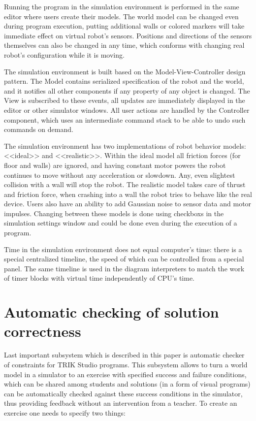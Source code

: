 \documentclass[conference]{IEEEtran}
\begin{document}
Running the program in the simulation environment is performed in the same editor where users create their models. The world model can be changed even during program execution, putting additional walls or colored markers will take immediate effect on virtual robot's sensors. Positions and directions of the sensors themselves can also be changed in any time, which conforms with changing real robot's configuration while it is moving.

The simulation environment is built based on the Model-View-Controller design pattern. The Model contains serialized specification of the robot and the world, and it notifies all other components if any property of any object is changed. The View is subscribed to these events, all updates are immediately displayed in the editor or other simulator windows. All user actions are handled by the Controller component, which uses an intermediate command stack to be able to undo such commands on demand.

The simulation environment has two implementations of robot behavior models: <<ideal>> and <<realistic>>. Within the ideal model all friction forces (for floor and walls) are ignored, and having constant motor powers the robot continues to move without any acceleration or slowdown. Any, even slightest collision with a wall will stop the robot. The realistic model takes care of thrust and friction force, when crashing into a wall the robot tries to behave like the real device. Users also have an ability to add Gaussian noise to sensor data and motor impulses. Changing between these models is done using checkboxs in the simulation settings window and could be done even during the execution of a program. 

Time in the simulation environment does not equal computer's time: there is a special centralized timeline, the speed of which can be controlled from a special panel. The same timeline is used in the diagram interpreters to match the work of timer blocks with virtual time independently of CPU's time.

\section{Automatic checking of solution correctness}
\label{chapter:constraintsChecker}

Last important subsystem which is described in this paper is automatic checker of constraints for TRIK Studio programs. This subsystem allows to turn a world model in a simulator to an exercise with specified success and failure conditions, which can be shared among students and solutions (in a form of visual programs) can be automatically checked against these success conditions in the simulator, thus providing feedback without an intervention from a teacher. To create an exercise one needs to specify two things:
\end{document}
